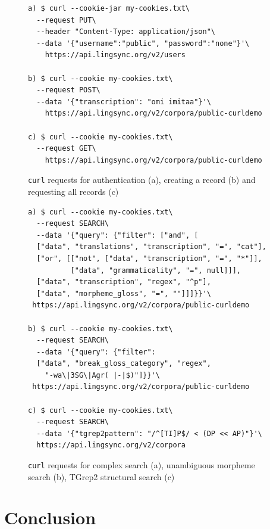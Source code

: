 \documentclass[11pt]{article}
\begin{document}
\begin{figure}[h]
\scriptsize

\begin{verbatim}
a) $ curl --cookie-jar my-cookies.txt\
  --request PUT\
  --header "Content-Type: application/json"\
  --data '{"username":"public", "password":"none"}'\
    https://api.lingsync.org/v2/users

b) $ curl --cookie my-cookies.txt\
  --request POST\
  --data '{"transcription": "omi imitaa"}'\
    https://api.lingsync.org/v2/corpora/public-curldemo

c) $ curl --cookie my-cookies.txt\
  --request GET\
    https://api.lingsync.org/v2/corpora/public-curldemo
\end{verbatim}
\caption{\texttt{curl} requests for authentication (a), creating a record (b)
and requesting all records (c)}
\normalsize
\label{fig:api-basic}
\end{figure}


\begin{figure}[h]
\scriptsize
\begin{verbatim}
a) $ curl --cookie my-cookies.txt\
  --request SEARCH\
  --data '{"query": {"filter": ["and", [
  ["data", "translations", "transcription", "=", "cat"],
  ["or", [["not", ["data", "transcription", "=", "*"]],
          ["data", "grammaticality", "=", null]]],
  ["data", "transcription", "regex", "^p"],
  ["data", "morpheme_gloss", "=", ""]]]}}'\
 https://api.lingsync.org/v2/corpora/public-curldemo
 
b) $ curl --cookie my-cookies.txt\
  --request SEARCH\
  --data '{"query": {"filter":
  ["data", "break_gloss_category", "regex",
    "-wa\|3SG\|Agr( |-|$)"]}}'\
 https://api.lingsync.org/v2/corpora/public-curldemo

c) $ curl --cookie my-cookies.txt\
  --request SEARCH\
  --data '{"tgrep2pattern": "/^[TI]P$/ < (DP << AP)"}'\
  https://api.lingsync.org/v2/corpora
\end{verbatim}
\caption{\texttt{curl} requests for complex search (a), unambiguous morpheme
search (b), TGrep2 structural search (c)}
\normalsize
\label{fig:api-search}
\end{figure}


\section{Conclusion}
\end{document}
